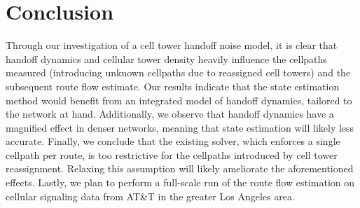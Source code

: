 
\section{Conclusion}
Through our investigation of a cell tower handoff noise model, it is clear that handoff dynamics and cellular tower density heavily influence the cellpaths measured (introducing unknown cellpaths due to reassigned cell towers) and the subsequent route flow estimate. Our results indicate that the state estimation method would benefit from an integrated model of handoff dynamics, tailored to the network at hand. Additionally, we observe that handoff dynamics have a magnified effect in denser networks, meaning that state estimation will likely less accurate. Finally, we conclude that the existing solver, which enforces a single cellpath per route, is too restrictive for the cellpaths introduced by cell tower reassignment. Relaxing this assumption will likely ameliorate the aforementioned effects. Lastly, we plan to perform a full-scale run of the route flow estimation on cellular signaling data from AT\&T in the greater Los Angeles area.
